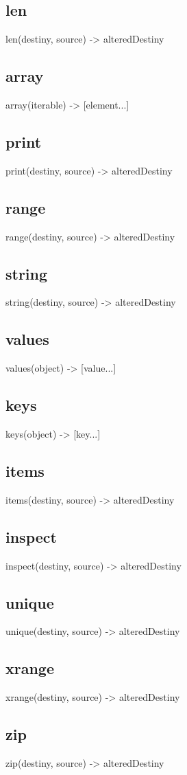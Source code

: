 {{{{{{{{\subsection*{len}
len(destiny, source) -> alteredDestiny
\subsection*{array}
array(iterable) -> [element...]
\subsection*{print}
print(destiny, source) -> alteredDestiny
\subsection*{range}
range(destiny, source) -> alteredDestiny
\subsection*{string}
string(destiny, source) -> alteredDestiny
\subsection*{values}
values(object) -> [value...]
\subsection*{keys}
keys(object) -> [key...]
\subsection*{items}
items(destiny, source) -> alteredDestiny
\subsection*{inspect}
inspect(destiny, source) -> alteredDestiny
\subsection*{unique}
unique(destiny, source) -> alteredDestiny
\subsection*{xrange}
xrange(destiny, source) -> alteredDestiny
\subsection*{zip}
zip(destiny, source) -> alteredDestiny

}}}}}}}}
